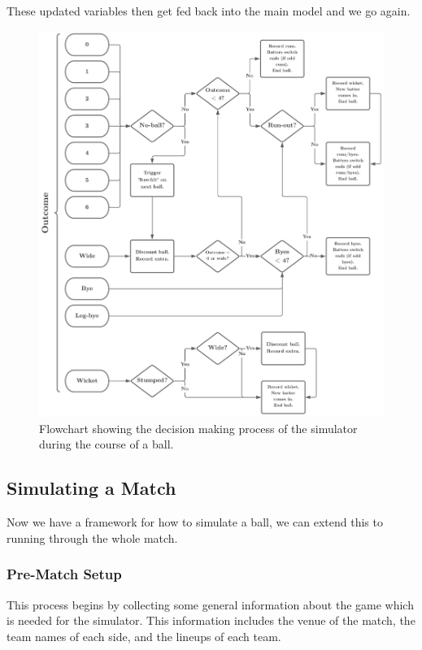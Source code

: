 These updated variables then get fed back into the main model and we go again.

\begin{figure}
    \centering
    \includegraphics[width=1\columnwidth]{images/cricket flowchart (2).png}
    \caption{Flowchart showing the decision making process of the simulator during the course of a ball.}
    \label{fig: flowchart}
\end{figure}

\subsection{Simulating a Match}
\label{subsec: sim match}

Now we have a framework for how to simulate a ball, we can extend this to running through the whole match. 

\subsubsection{Pre-Match Setup}

This process begins by collecting some general information about the game which is needed for the simulator. This information includes the venue of the match, the team names of each side, and the lineups of each team. 

